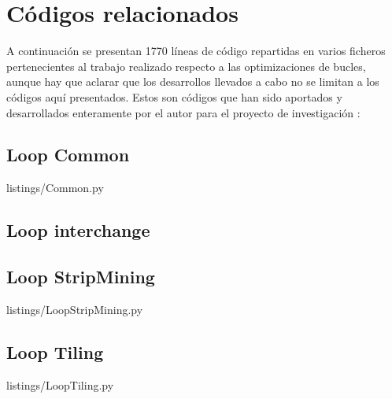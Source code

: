 %
%
%

\chapter{Códigos relacionados} 
\label{ap:apx_1}

A continuación se presentan 1770 líneas de código repartidas en varios ficheros
pertenecientes al trabajo realizado respecto a las optimizaciones de bucles,
aunque hay que aclarar que los desarrollos llevados a cabo no se limitan a
los códigos aquí presentados. Estos son códigos que han sido aportados y
desarrollados enteramente por el autor para el proyecto de investigación \accULL{}:

\section{Loop Common}

{listings/Common.py} %

\section{Loop interchange}

\section{Loop StripMining}

{listings/LoopStripMining.py} %

\section{Loop Tiling}

{listings/LoopTiling.py} %

